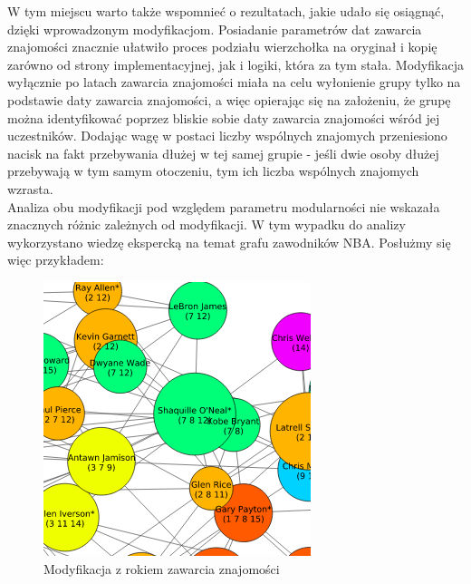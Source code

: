 \documentclass{article}
\begin{document}
W tym miejscu warto także wspomnieć o rezultatach, jakie udało się osiągnąć, dzięki wprowadzonym modyfikacjom. Posiadanie parametrów dat zawarcia znajomości znacznie ułatwiło proces podziału wierzchołka na oryginał i kopię zarówno od strony implementacyjnej, jak i logiki, która za tym stała. Modyfikacja wyłącznie po latach zawarcia znajomości miała na celu wyłonienie grupy tylko na podstawie daty zawarcia znajomości, a więc opierając się na założeniu, że grupę można identyfikować poprzez bliskie sobie daty zawarcia znajomości wśród jej uczestników. Dodając wagę w postaci liczby wspólnych znajomych przeniesiono nacisk na fakt przebywania dłużej w tej samej grupie - jeśli dwie osoby dłużej przebywają w tym samym otoczeniu, tym ich liczba wspólnych znajomych wzrasta.\\

Analiza obu modyfikacji pod względem parametru modularności nie wskazała znacznych różnic zależnych od modyfikacji. W tym wypadku do analizy wykorzystano wiedzę ekspercką na temat grafu zawodników NBA. Posłużmy się więc przykładem:

\begin{figure}[H]
\centering
\includegraphics[width=\textwidth]{images/is-sample-6.png}
\caption{Modyfikacja z rokiem zawarcia znajomości}
\end{figure}
\end{document}
